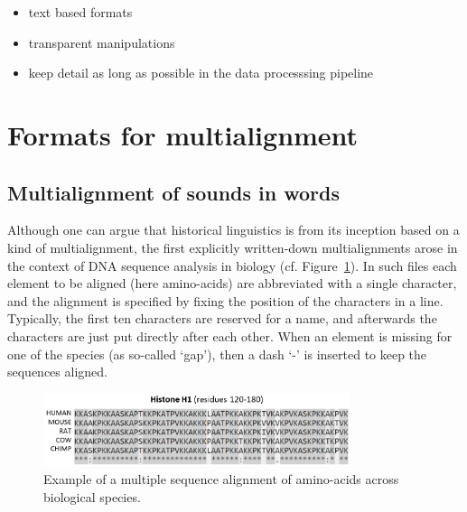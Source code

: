 \documentclass[11pt]{article}
\begin{document}
\begin{itemize}[nolistsep]
\item text based formats
\item transparent manipulations
\item keep detail as long as possible in the data processsing pipeline
\end{itemize}

\section{Formats for multialignment}

\subsection{Multialignment of sounds in words}

Although one can argue that historical linguistics is from its inception based on a kind of multialignment, the first explicitly written-down multialignments arose in the context of DNA sequence analysis in biology (cf. Figure~\ref{fig:aminoacids}). In such files each element to be aligned (here amino-acids) are abbreviated with a single character, and the alignment is specified by fixing the position of the characters in a line. Typically, the first ten characters are reserved for a name, and afterwards the characters are just put directly after each other. When an element is missing for one of the species (as so-called `gap'), then a dash `-' is inserted to keep the sequences aligned.

\begin{figure}[htbp] 
	\centering
	\includegraphics[width=0.8\textwidth]{images/Histone_Alignment.png}
 	\caption{Example of a multiple sequence alignment of amino-acids across biological species.\protect\footnotemark}
	\label{fig:aminoacids}
\end{figure}
\end{document}
